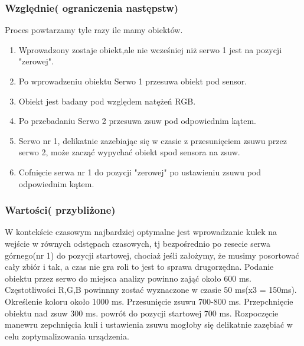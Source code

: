 \documentclass[12pt]{article}
\begin{document}
\subsubsection{Względnie( ograniczenia następstw)}
Proces powtarzamy tyle razy ile mamy obiektów.\\
\begin{enumerate}
\item Wprowadzony zostaje obiekt,ale  nie wcześniej niż serwo 1 jest na pozycji "zerowej".
\item Po wprowadzeniu obiektu Serwo 1 przesuwa obiekt pod sensor.
\item Obiekt jest badany pod względem natężeń RGB.
\item Po przebadaniu Serwo 2 przesuwa zsuw pod odpowiednim kątem.
\item Serwo nr 1, delikatnie zazebiając się w czasie z przesunięciem zsuwu przez serwo 2, może zacząć wypychać obiekt spod sensora na zsuw.
\item Cofnięcie serwa nr 1 do pozycji "zerowej" po ustawieniu zsuwu pod odpowiednim kątem.
\end{enumerate}
\subsubsection{Wartości( przybliżone)}
W kontekście czasowym najbardziej optymalne jest wprowadzanie kulek na wejście w równych odstępach czasowych, tj bezpośrednio po resecie serwa górnego(nr 1) do pozycji startowej, chociaż jeśli założymy, że musimy posortować cały zbiór i tak, a czas nie gra roli to jest to sprawa drugorzędna. Podanie obiektu przez serwo do miejsca analizy powinno zająć około 600 ms. Częstotliwości R,G,B powinnny zostać wyznaczone w czasie 50 ms(x3 = 150ms). Określenie koloru około 1000 ms.  Przesunięcie zsuwu 700-800 ms. Przepchnięcie obiektu nad zsuw 300 ms.
powrót do pozycji startowej 700 ms. Rozpoczęcie manewru zepchnięcia kuli i ustawienia zsuwu mogłoby się delikatnie zazębiać w celu zoptymalizowania urządzenia.
\end{document}
